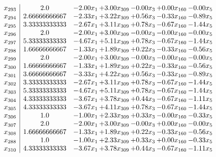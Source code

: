 \documentclass[8pt]{article}
\begin{document}
\[\begin{array}{c| c c@{\hskip 2pt} c@{\hskip 2pt} c@{\hskip 2pt} c@{\hskip 2pt} c@{\hskip 2pt} }
 x_{293}   &  2.0 & -2.00 x_{1} & +  3.00 x_{309} & -0.00 x_{3} & +  0.00 x_{160} & -0.00 x_{5}\\
 x_{294}   &  2.66666666667 & -2.33 x_{1} & +  3.22 x_{309} & +  0.56 x_{3} & -0.33 x_{160} & -0.89 x_{5}\\
 x_{295}   &  3.33333333333 & -2.67 x_{1} & +  3.11 x_{309} & +  0.78 x_{3} & -0.67 x_{160} & -1.44 x_{5}\\
 x_{296}   &  2.0 & -2.00 x_{1} & +  3.00 x_{309} & -0.00 x_{3} & -0.00 x_{160} & -0.00 x_{5}\\
 x_{297}   &  5.33333333333 & -4.67 x_{1} & +  5.11 x_{309} & +  0.78 x_{3} & -0.67 x_{160} & -1.44 x_{5}\\
 x_{298}   &  1.66666666667 & -1.33 x_{1} & +  1.89 x_{309} & +  0.22 x_{3} & -0.33 x_{160} & -0.56 x_{5}\\
 x_{299}   &  2.0 & -2.00 x_{1} & +  3.00 x_{309} & -0.00 x_{3} & -0.00 x_{160} & -0.00 x_{5}\\
 x_{300}   &  1.66666666667 & -1.33 x_{1} & +  1.89 x_{309} & +  0.22 x_{3} & -0.33 x_{160} & -0.56 x_{5}\\
 x_{301}   &  3.66666666667 & -3.33 x_{1} & +  4.22 x_{309} & +  0.56 x_{3} & -0.33 x_{160} & -0.89 x_{5}\\
 x_{302}   &  3.33333333333 & -2.67 x_{1} & +  3.11 x_{309} & +  0.78 x_{3} & -0.67 x_{160} & -1.44 x_{5}\\
 x_{303}   &  5.33333333333 & -4.67 x_{1} & +  5.11 x_{309} & +  0.78 x_{3} & -0.67 x_{160} & -1.44 x_{5}\\
 x_{304}   &  4.33333333333 & -3.67 x_{1} & +  3.78 x_{309} & +  0.44 x_{3} & -0.67 x_{160} & -1.11 x_{5}\\
 x_{305}   &  4.33333333333 & -3.67 x_{1} & +  4.11 x_{309} & +  0.78 x_{3} & -0.67 x_{160} & -1.44 x_{5}\\
 x_{306}   &  1.0 & -1.00 x_{1} & +  2.33 x_{309} & +  0.33 x_{3} & -0.00 x_{160} & -0.33 x_{5}\\
 x_{307}   &  2.0 & -2.00 x_{1} & +  3.00 x_{309} & -0.00 x_{3} & +  0.00 x_{160} & -0.00 x_{5}\\
 x_{308}   &  1.66666666667 & -1.33 x_{1} & +  1.89 x_{309} & +  0.22 x_{3} & -0.33 x_{160} & -0.56 x_{5}\\
 x_{288}   &  1.0 & -1.00 x_{1} & +  2.33 x_{309} & +  0.33 x_{3} & +  0.00 x_{160} & -0.33 x_{5}\\
 x_{310}   &  4.33333333333 & -3.67 x_{1} & +  3.78 x_{309} & +  0.44 x_{3} & -0.67 x_{160} & -1.11 x_{5}\\

\end{array}\]
\end{document}
